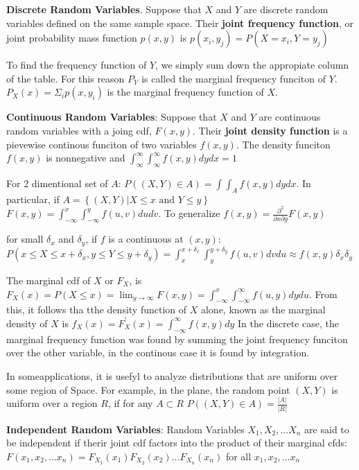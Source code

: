 \documentclass{article}
\begin{document}
\begin{multicols*}{2}
    \textbf{Discrete Random Variables}.
    Suppose that $X$ and $Y$ are discrete random variables defined on the same sample space.
    Their \textbf{joint frequency function}, or joint probability mass function $p(x, y)$ is $p(x_i, y_j) = P(X=x_i, Y=y_j)$

    To find the frequency function of $Y$, we simply sum down the appropiate column of the table.
    For this reason $P_Y$ is called the marginal frequency funciton of $Y$.
    $P_X(x) = \Sigma_i p(x, y_i)$ is the marginal frequency function of $X$.

    \textbf{Continuous Random Variables}:
    Suppose that $X$ and $Y$ are continuous random variables with a joing cdf, $F(x, y)$.
    Their \textbf{joint density function} is a pievewise continous funciton of two variables $f(x, y)$.
    The density funciton $f(x, y)$ is nonnegative and $\int^\infty_{\infty} \int^\infty_{\infty} f(x, y) dy dx = 1$

    For 2 dimentional set of $A$: $P((X, Y) \in A) = \int \int_A f(x, y) dy dx$.
    In particular, if $A = \left\{ (X, Y) \vert X\leq x \text{ and } Y \leq y \right\}$
    $F(x, y) = \int_{-\infty}^x \int_{-\infty}^y f(u, v) du dv$.
    To generalize $f(x, y) = \frac{\partial^2}{\partial x \partial y} F(x, y)$

    for small $\delta_x$ and $\delta_y$, if $f$ is a continuous at $\left( x, y \right)$:
    $P( x \leq X \leq x + \delta_x , y \leq Y \leq y + \delta_y) = \int_x^{x+\delta_x} \int_y^{y+\delta_y} f(u, v) dv du \approx f(x, y) \delta_x \delta_y$

    The marginal cdf of $X$ or $F_X$, is $F_X(x) = P(X \leq x) = \lim_{y\rightarrow \infty}F(x, y) = \int_{-\infty}^x \int_{-\infty}^\infty f(u, y) dy du$.
    From this, it follows tha tthe density function of $X$ alone, known as the marginal density of $X$ is $f_X(x) = F^\prime_X(x) = \int^\infty_{-\infty} f(x, y)dy$
    In the discrete case, the marginal frequency function was found by summing the joint frequency funciton over the other variable, in the continous case it is found by integration.

    In someapplications, it is usefyl to analyze distributions that are uniform over some region of Space. For example, in the plane, the random point $\left(X, Y\right)$ is uniform over a region $R$, if for any $A \subset R$
    $P((X, Y) \in A) = \frac{\left| A \right|}{\left| R \right|}$

    \textbf{Independent Random Variables}: Random Variables $X_1, X_2, \dots X_n$ are said to be independent if therir joint cdf
    factors into the product of their marginal cfds: $F(x_1, x_2, \dots x_n) = F_{X_1}(x_1)F_{X_2}(x_2)\dots F_{X_n}(x_n)$ for all $x_1, x_2, \dots x_n$


\end{multicols*}
\end{document}
